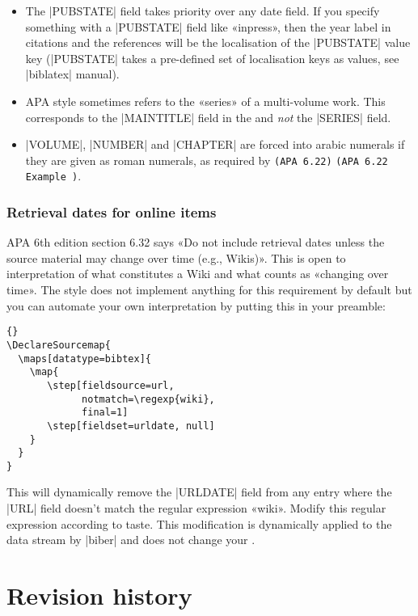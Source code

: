 \documentclass{ltxdockit}
\newcommand\apa[2][]{\ifthenelse{\equal{#1}{}}%
                       {\texttt{(APA #2)}}%
                       {\texttt{(APA #2 Example #1)}}}
\begin{document}
\begin{itemize}
\setlength{\itemsep}{0pt}
\item The |PUBSTATE| field takes priority over any date field. If you specify
  something with a |PUBSTATE| field like «inpress», then the year label in
  citations and the references will be the localisation of the |PUBSTATE|
  value key (|PUBSTATE| takes a pre-defined set of localisation keys as
  values, see |biblatex| manual).
\item APA style sometimes refers to the «series» of a multi-volume work.
  This corresponds to the |MAINTITLE| field in the  and
  \emph{not} the |SERIES| field.
\item |VOLUME|, |NUMBER| and |CHAPTER| are forced into arabic numerals if
  they are given as roman numerals, as required by \apa{6.22}.
\end{itemize}

\subsubsection{Retrieval dates for online items}

APA 6th edition section 6.32 says «Do not include retrieval dates unless
the source material may change over time (e.g., Wikis)». This is open to
interpretation of what constitutes a Wiki and what counts as «changing over
time». The style does not implement anything for this requirement by
default but you can automate your own interpretation by putting this in
your preamble:

\begin{lstlisting}[style=latex]{}
\DeclareSourcemap{
  \maps[datatype=bibtex]{
    \map{
       \step[fieldsource=url,
             notmatch=\regexp{wiki},
             final=1]
       \step[fieldset=urldate, null]
    }
  }
}
\end{lstlisting}

\noindent This will dynamically remove the |URLDATE| field from any entry
where the |URL| field doesn't match the regular expression «wiki». Modify this
regular expression according to taste. This modification is dynamically
applied to the data stream by |biber| and does not change your .

\section{Revision history}\label{rev}
\end{document}
